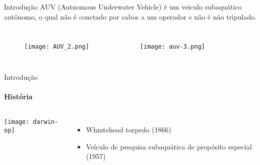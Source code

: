 \begin{frame}[t]{Introdução} 
    \transdissolve[duration=0.5]
    AUV (Autnomous Underwater Vehicle) é um veiculo subaquático autônomo, o qual não é conctado por cabos 
    a um operador e não é não tripulado.

    \begin{columns}[t]
        
        \begin{figure}
            \texttt{[image: AUV\_2.png]}%
            \caption{\nocite{REMUS6001:online}}
        \end{figure}
        
        \begin{figure}
           \texttt{[image: auv-3.png]}%
            \caption{\nocite{BlueROV210:online}}
        \end{figure}
        
    \end{columns}

\end{frame}
\begin{frame}[t]{Introdução}
    \transboxout[duration=0.5]
    \framesubtitle{História}
    \begin{columns}
            \texttt{[image: darwin-op]}
            \begin{itemize}
               \item Whintehead torpedo (1866)
               \item Veículo de pesquisa subaquática de propósito especial (1957)
            \end{itemize}
    \end{columns}
\end{frame}
